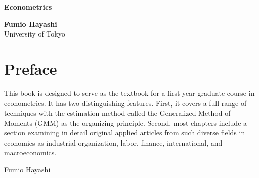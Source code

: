 
\begin{titlepage}
\vspace*{3cm}

{\LARGE\bfseries Econometrics\par}

\vspace{2cm}
{\large\bfseries Fumio Hayashi}\\[0.5em]
{\normalsize University of Tokyo}

\vfill
\end{titlepage}

\clearpage\thispagestyle{empty}\mbox{}\clearpage

\chapter*{Preface}

This book is designed to serve as the textbook for a first-year graduate course in
econometrics. It has two distinguishing features. First, it covers a full range of
techniques with the estimation method called the Generalized Method of Moments
(GMM) as the organizing principle. Second, most chapters include a section
examining in detail original applied articles from such diverse fields in economics
as industrial organization, labor, finance, international, and macroeconomics.

\vspace{1em}
\hfill Fumio Hayashi
